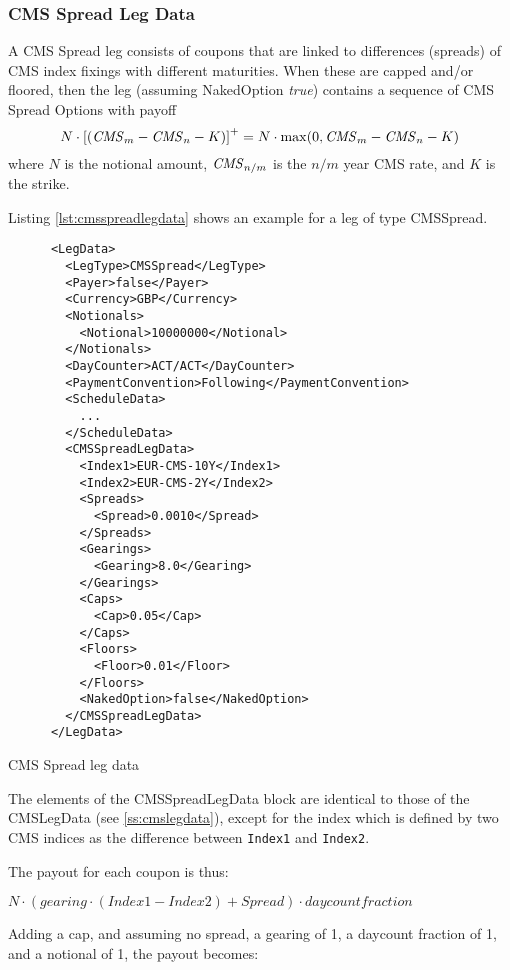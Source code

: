 \subsubsection{CMS Spread Leg Data}
\label{ss:cmsspreadlegdata}

A CMS Spread leg consists of coupons that are linked to differences (spreads)
of CMS index fixings with different maturities. When these are capped and/or floored,
then the leg (assuming NakedOption \emph{true}) contains a sequence of CMS Spread Options with payoff
$$
N\cdot\left[(\mathit{CMS}_m -\mathit{CMS}_n - K)\right]^+ = N\cdot \max(0,\mathit{CMS}_m-\mathit{CMS}_n - K)
$$
where $N$ is the notional amount, $\mathit{CMS}_{n/m}$ is the $n/m$ year CMS rate,
and $K$ is the strike.

Listing \ref{lst:cmsspreadlegdata} shows an example for a leg of type CMSSpread.

\begin{listing}[H]
\begin{verbatim}
      <LegData>
        <LegType>CMSSpread</LegType>
        <Payer>false</Payer>
        <Currency>GBP</Currency>
        <Notionals>
          <Notional>10000000</Notional>
        </Notionals>
        <DayCounter>ACT/ACT</DayCounter>
        <PaymentConvention>Following</PaymentConvention>
        <ScheduleData>
          ...
        </ScheduleData>
        <CMSSpreadLegData>
          <Index1>EUR-CMS-10Y</Index1>
          <Index2>EUR-CMS-2Y</Index2>
          <Spreads>
            <Spread>0.0010</Spread>
          </Spreads>
          <Gearings>
            <Gearing>8.0</Gearing>
          </Gearings>
          <Caps>
            <Cap>0.05</Cap>
          </Caps>
          <Floors>
            <Floor>0.01</Floor>
          </Floors>
          <NakedOption>false</NakedOption>  
        </CMSSpreadLegData>
      </LegData>
\end{verbatim}
\caption{CMS Spread leg data}
\label{lst:cmsspreadlegdata}
\end{listing}

The elements of the CMSSpreadLegData block are identical to those of the CMSLegData (see \ref{ss:cmslegdata}), except
for the index which is defined by two CMS indices as the difference between \verb+Index1+ and \verb+Index2+.

The payout for each coupon is thus:

$
N \cdot (gearing \cdot (Index1 - Index2) + Spread)  \cdot daycountfraction
$

Adding a cap, and assuming no spread,  a gearing of 1, a daycount fraction of 1, and a notional of 1, the payout becomes:

